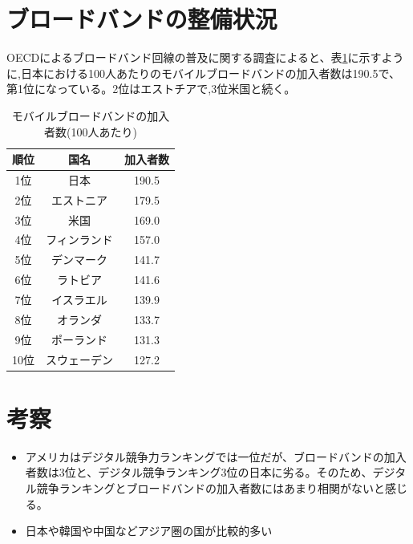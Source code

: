 \documentclass[a4paper,11pt,dvipdfmx]{ujarticle}
\begin{document}
\section{ブロードバンドの整備状況}
OECDによるブロードバンド回線の普及に関する調査\cite{oecd}によると、表\ref{country}に示すように,日本における100人あたりのモバイルブロードバンドの加入者数は190.5で、第1位になっている。2位はエストチアで,3位米国と続く。
\begin{table}[htbp]
    \centering
    \caption{ モバイルブロードバンドの加入者数(100人あたり)}\label{country}
    \begin{tabular}{|c|c|c|}
        \hline
        順位 & 国名 & 加入者数 \\
        \hline
        1位 & 日本 & 190.5 \\
        \hline
        2位 & エストニア & 179.5 \\
        \hline
        3位 & 米国 & 169.0 \\
        \hline
        4位 & フィンランド & 157.0 \\
        \hline
        5位 & デンマーク & 141.7 \\
        \hline
        6位 & ラトビア & 141.6 \\
        \hline
        7位 & イスラエル & 139.9 \\
        \hline
        8位 & オランダ & 133.7 \\
        \hline
        9位 & ポーランド & 131.3 \\
        \hline
        10位 & スウェーデン & 127.2 \\
        \hline
    \end{tabular}
\end{table}
\section{考察}
\begin{itemize}
    \item アメリカはデジタル競争力ランキングでは一位だが、ブロードバンドの加入者数は3位と、デジタル競争ランキング3位の日本に劣る。そのため、デジタル競争ランキングとブロードバンドの加入者数にはあまり相関がないと感じる。
    \item 日本や韓国や中国などアジア圏の国が比較的多い
\end{itemize}
%
%


\end{document}
